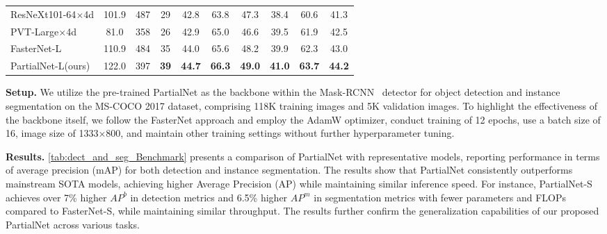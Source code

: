 \begin{table*}[ht]
{\begin{tabular}{@{}lccccc cccc@{}}
    \hline
    ResNeXt101-64$\times$4d\cite{Xie2017} & 101.9   & 487   &29          & 42.8       & 63.8       & 47.3       & 38.4       & 60.6       & 41.3       \\
    PVT-Large$\times$4d\cite{Wang2021c}   & 81.0    & 358   &26          & 42.9       & 65.0       & 46.6       & 39.5       & 61.9       & 42.5       \\
    FasterNet-L\cite{Chen2023}            & 110.9   & 484   &35          & 44.0       & 65.6       & 48.2       & 39.9       & 62.3       & 43.0       \\
    PartialNet-L(ours)                    & 122.0   & 397   &{\bf 39}    & {\bf 44.7} & {\bf 66.3} & {\bf 49.0} & {\bf 41.0} & {\bf 63.7} & {\bf 44.2} \\
    \bottomrule
  \end{tabular}
  }
  \caption{Results using PartialNet-S/M/L on object detection and instance segmentation benchmark in COCO dataset.}
  \label{tab:dect_and_seg_Benchmark}
\end{table*}

{\bf Setup.} We utilize the pre-trained PartialNet as the backbone within the Mask-RCNN~\cite{he2017mask} detector for object detection and instance segmentation on the MS-COCO 2017 dataset, comprising 118K training images and 5K validation images. To highlight the effectiveness of the backbone itself, we follow the FasterNet approach and employ the AdamW optimizer, conduct training of 12 epochs, use a batch size of 16, image size of 1333$\times$800, and maintain other training settings without further hyperparameter tuning.

{\bf Results.} \cref{tab:dect_and_seg_Benchmark} presents a comparison of PartialNet with representative models, reporting performance in terms of average precision (mAP) for both detection and instance segmentation. The results show that PartialNet consistently outperforms mainstream SOTA models, achieving higher Average Precision (AP) while maintaining similar inference speed. For instance, PartialNet-S achieves over 7\% higher $AP^{b}$ in detection metrics and 6.5\% higher $AP^{m}$ in segmentation metrics with fewer parameters and FLOPs compared to FasterNet-S, while maintaining similar throughput. The results further confirm the generalization capabilities of our proposed PartialNet across various tasks.

